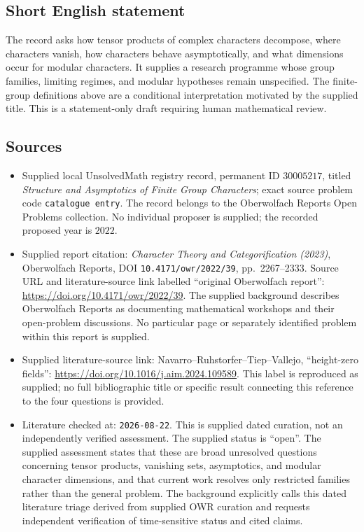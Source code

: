 \documentclass[11pt]{article}
\begin{document}
\subsection{Short English statement}
The record asks how tensor products of complex characters decompose, where characters vanish, how characters behave asymptotically, and what dimensions occur for modular characters. It supplies a research programme whose group families, limiting regimes, and modular hypotheses remain unspecified. The finite-group definitions above are a conditional interpretation motivated by the supplied title. This is a statement-only draft requiring human mathematical review.
\subsection{Sources}
\begin{itemize}
\item Supplied local UnsolvedMath registry record, permanent ID \(30005217\), titled \emph{Structure and Asymptotics of Finite Group Characters}; exact source problem code \texttt{catalogue entry}. The record belongs to the Oberwolfach Reports Open Problems collection. No individual proposer is supplied; the recorded proposed year is \(2022\).
\item Supplied report citation: \emph{Character Theory and Categorification (2023)}, Oberwolfach Reports, DOI \texttt{10.4171/owr/2022/39}, pp.~2267--2333. Source URL and literature-source link labelled ``original Oberwolfach report'': \url{https://doi.org/10.4171/owr/2022/39}. The supplied background describes Oberwolfach Reports as documenting mathematical workshops and their open-problem discussions. No particular page or separately identified problem within this report is supplied.
\item Supplied literature-source link: Navarro--Ruhstorfer--Tiep--Vallejo, ``height-zero fields'': \url{https://doi.org/10.1016/j.aim.2024.109589}. This label is reproduced as supplied; no full bibliographic title or specific result connecting this reference to the four questions is provided.
\item Literature checked at: \texttt{2026-08-22}. This is supplied dated curation, not an independently verified assessment. The supplied status is ``open''. The supplied assessment states that these are broad unresolved questions concerning tensor products, vanishing sets, asymptotics, and modular character dimensions, and that current work resolves only restricted families rather than the general problem. The background explicitly calls this dated literature triage derived from supplied OWR curation and requests independent verification of time-sensitive status and cited claims.

\end{itemize}
\end{document}
